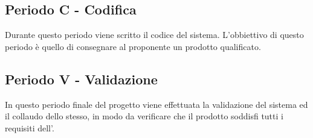 \documentclass[./PianoDiProgetto.tex]{subfiles}
\begin{document}
  \subsection{Periodo C - Codifica}

  Durante questo periodo viene scritto il codice del sistema. L'obbiettivo
  di questo periodo è quello di consegnare al proponente un prodotto qualificato.

  \subsection{Periodo V - Validazione}

  In questo periodo finale del progetto viene effettuata la validazione del sistema ed il
  collaudo dello stesso, in modo da verificare che il prodotto soddisfi tutti i requisiti
  dell'\ARdoc. 
\end{document}
